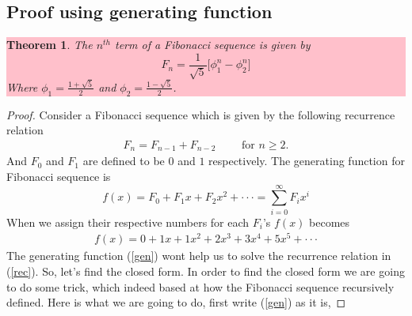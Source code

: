 \documentclass[paper=a4, fontsize=11pt,twoside]{scrartcl}		%
\newtheorem{thm}{Theorem}[section]
\theoremstyle{definition}
\theoremstyle{remark}
\begin{document}
\subsection{Proof using generating function}
\colorbox{pink}{\parbox{\textwidth}{
\begin{thm}\label{thm}
The $n^{th}$ term of a Fibonacci sequence is given by
$$
F_n=\frac{1}{\sqrt{5}}\biggl[\phi_1^n-\phi_2^n \biggl]
$$
Where $\phi_1=\frac{1+\sqrt{5}}{2}$ and $\phi_2=\frac{1-\sqrt{5}}{2}$.
\end{thm}}}
\begin{proof}
Consider a Fibonacci sequence which is given by the following recurrence relation
\begin{align}\label{rec}
F_n=F_{n-1}+F_{n-2}\qquad \text{ for } n\geq2.
\end{align}
And $F_0$ and $F_1$ are defined to be $0$ and $1$ respectively.
The generating function for Fibonacci sequence is
$$
f(x)=F_0+F_1x+F_2x^2+\cdot\cdot\cdot=\sum_{i=0}^\infty F_ix^i
$$
When we assign their respective numbers for each $F_i$'s $f(x)$ becomes
\begin{align}\label{gen}
f(x)=0+1x+1x^2+2x^3+3x^4+5x^5+\cdot\cdot\cdot
\end{align}
The generating function (\ref{gen}) wont help us to solve the recurrence relation in (\ref{rec}). So, let's find the closed form. In order to find the closed form we are going to do some trick, which indeed based at how the Fibonacci sequence recursively defined. Here is what we are going to do, first write (\ref{gen}) as it is,


\end{proof}
\end{document}
